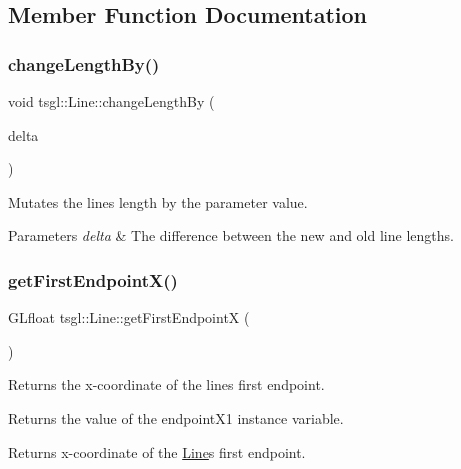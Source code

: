 \subsection{Member Function Documentation}
\mbox{\label{classtsgl_1_1_line_a08e1742777de62d8b153ab5fb0320770}} 
\subsubsection{\texorpdfstring{change\+Length\+By()}{changeLengthBy()}}
{\footnotesize\ttfamily void tsgl\+::\+Line\+::change\+Length\+By (\begin{DoxyParamCaption}\item[{G\+Lfloat}]{delta }\end{DoxyParamCaption})}



Mutates the line\textquotesingle{}s length by the parameter value. 


\begin{DoxyParams}{Parameters}
{\em delta} & The difference between the new and old line lengths. \\
\hline
\end{DoxyParams}
\mbox{\label{classtsgl_1_1_line_ad47b8acab48713ff03c305c4a8071669}} 
\subsubsection{\texorpdfstring{get\+First\+Endpoint\+X()}{getFirstEndpointX()}}
{\footnotesize\ttfamily G\+Lfloat tsgl\+::\+Line\+::get\+First\+EndpointX (\begin{DoxyParamCaption}{ }\end{DoxyParamCaption})}



Returns the x-\/coordinate of the line\textquotesingle{}s first endpoint. 

Returns the value of the endpoint\+X1 instance variable. \begin{DoxyReturn}{Returns}
x-\/coordinate of the \hyperlink{classtsgl_1_1_line}{Line}\textquotesingle{}s first endpoint. 
\end{DoxyReturn}


